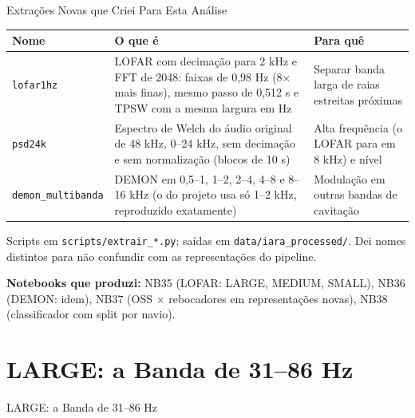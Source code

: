 \documentclass[aspectratio=169]{beamer}
\begin{document}
\begin{frame}{Extrações Novas que Criei Para Esta Análise}
    \footnotesize
    \begin{table}
    \centering
    \scriptsize
    \begin{tabular}{p{2.6cm}p{6.2cm}p{4.2cm}}
    \toprule
    \textbf{Nome} & \textbf{O que é} & \textbf{Para quê} \\
    \midrule
    \texttt{lofar1hz} & LOFAR com decimação para 2 kHz e FFT de 2048: faixas de 0,98 Hz (8$\times$ mais finas), mesmo passo de 0,512 s e TPSW com a mesma largura em Hz & Separar banda larga de raias estreitas próximas \\
    \texttt{psd24k} & Espectro de Welch do áudio original de 48 kHz, 0--24 kHz, sem decimação e sem normalização (blocos de 10 s) & Alta frequência (o LOFAR para em 8 kHz) e nível \\
    \texttt{demon\_multibanda} & DEMON em 0,5--1, 1--2, 2--4, 4--8 e 8--16 kHz (o do projeto usa só 1--2 kHz, reproduzido exatamente) & Modulação em outras bandas de cavitação \\
    \bottomrule
    \end{tabular}
    \end{table}
    \vspace{0.05cm}
    {\scriptsize Scripts em \texttt{scripts/extrair\_*.py}; saídas em \texttt{data/iara\_processed/}. Dei nomes distintos para não confundir com as representações do pipeline.\par}
    \vspace{0.1cm}
    {\scriptsize\textbf{Notebooks que produzi:} NB35 (LOFAR: LARGE, MEDIUM, SMALL), NB36 (DEMON: idem), NB37 (OSS $\times$ rebocadores em representações novas), NB38 (classificador com split por navio).\par}
\end{frame}

\section{LARGE: a Banda de 31--86 Hz}

\begin{frame}
    \centering
    \huge LARGE: a Banda de 31--86 Hz
\end{frame}
\end{document}
